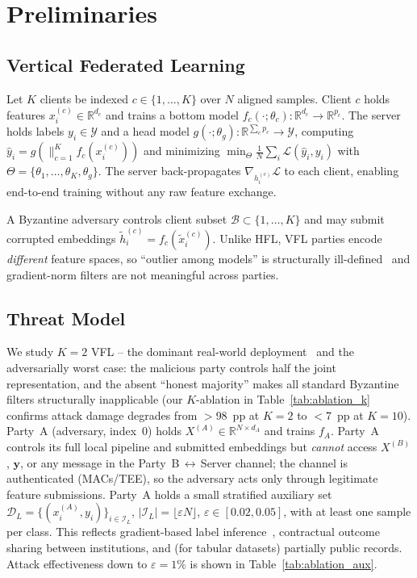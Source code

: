 \documentclass{article}
\begin{document}
\section{Preliminaries}
\label{sec:prelim}

\subsection{Vertical Federated Learning}
Let $K$ clients be indexed $c\in\{1,\ldots,K\}$ over $N$ aligned samples.
Client $c$ holds features $x_i^{(c)}\in\mathbb{R}^{d_c}$ and trains a bottom
model $f_c(\cdot;\theta_c):\mathbb{R}^{d_c}\to\mathbb{R}^{p_c}$.
The server holds labels $y_i\in\mathcal{Y}$ and a head model
$g(\cdot;\theta_g):\mathbb{R}^{\sum_c p_c}\to\mathcal{Y}$, computing
$\hat{y}_i = g\!\left(\big\|_{c=1}^K f_c(x_i^{(c)})\right)$
and minimizing $\min_\Theta \frac{1}{N}\sum_i \mathcal{L}(\hat{y}_i,y_i)$
with $\Theta=\{\theta_1,\ldots,\theta_K,\theta_g\}$.
The server back-propagates $\nabla_{h_i^{(c)}}\mathcal{L}$ to each client,
enabling end-to-end training without any raw feature exchange.

A Byzantine adversary controls client subset
$\mathcal{B}\subset\{1,\ldots,K\}$ and may submit corrupted embeddings
$\tilde{h}_i^{(c)}=f_c(\tilde{x}_i^{(c)})$.
Unlike HFL, VFL parties encode \emph{different} feature spaces, so
``outlier among models'' is structurally ill-defined~\citep{blanchard2017machine}
and gradient-norm filters are not meaningful across parties.

\subsection{Threat Model}
\label{sec:threat}

We study $K\!=\!2$ VFL -- the dominant real-world
deployment~\citep{yang2019federated,vepakomma2018split} and the adversarially
worst case: the malicious party controls half the joint representation, and
the absent ``honest majority'' makes all standard Byzantine filters
structurally inapplicable (our $K$-ablation in
Table~\ref{tab:ablation_k} confirms attack damage degrades from $>$98~pp at
$K\!=\!2$ to $<$7~pp at $K\!=\!10$).
Party~A (adversary, index~0) holds $X^{(A)}\in\mathbb{R}^{N\times d_A}$
and trains $f_A$.
Party~A controls its full local pipeline and submitted embeddings but
\emph{cannot} access $X^{(B)}$, $\mathbf{y}$, or any message in the
Party~B\,$\leftrightarrow$\,Server channel; the channel is authenticated
(MACs/TEE), so the adversary acts only through legitimate feature
submissions.
Party~A holds a small stratified auxiliary set
$\mathcal{D}_L = \{(x_i^{(A)},y_i)\}_{i\in\mathcal{I}_L}$,
$|\mathcal{I}_L|=\lfloor\varepsilon N\rfloor$, $\varepsilon\in[0.02,0.05]$,
with at least one sample per class.
This reflects gradient-based label inference~\citep{fu2022label},
contractual outcome sharing between institutions, and (for tabular
datasets) partially public records.
Attack effectiveness down to $\varepsilon\!=\!1\%$ is shown in
Table~\ref{tab:ablation_aux}.
\end{document}
